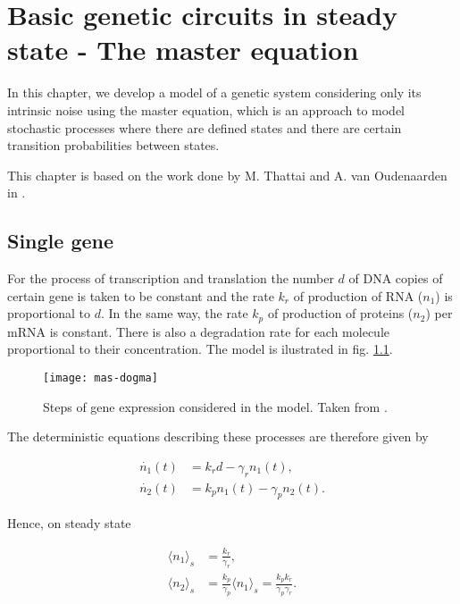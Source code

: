 \chapter{Basic genetic circuits in steady state - The master equation}
\label{ch:master}

In this chapter, we develop a model of a genetic system considering only its intrinsic noise using the master equation, which is an approach to model stochastic processes where there are defined states and there are certain transition probabilities between states.

This chapter is based on the work done by M. Thattai and A. van Oudenaarden in \cite{thattai01}.

\section{Single gene}

For the process of transcription and translation the number $d$ of DNA copies of certain gene is taken to be constant and the rate $k_r$ of production of RNA ($n_1$) is proportional to $d$. In the same way, the rate $k_p$ of production of proteins ($n_2$) per mRNA is constant. There is also a degradation rate for each molecule proportional to their concentration. The model is ilustrated in fig. \ref{fig:mas-dogma}.

\begin{figure}[H]
  \centering
  \texttt{[image: mas-dogma]}
  \caption[Model of gene expression for a single gene]{\label{fig:mas-dogma} Steps of gene expression considered in the model. Taken from \cite{thattai01}.}
\end{figure}

The deterministic equations describing these processes are therefore given by

\begin{align}
  \dot{n_1}(t) &= k_rd-\gamma_rn_1(t)\label{eq:mas-simple_det_1},\\
  \dot{n_2}(t) &= k_pn_1(t)-\gamma_pn_2(t) \label{eq:mas-simple_det_2}.
\end{align}

Hence, on steady state

\begin{align}
  \langle n_1 \rangle_s &= \frac{k_r}{\gamma_r} \label{eq:mas-simple_ss_1}, \\
  \langle n_2 \rangle_s &= \frac{k_p}{\gamma_p} \langle n_1 \rangle_s = \frac{k_pk_r}{\gamma_p\gamma_r} \label{eq:mas-simple_ss_2}.
\end{align}

